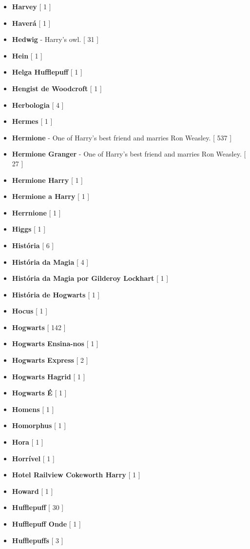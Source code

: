 \documentclass[a4paper]{article}
\begin{document}
\begin{itemize}
	\item \textbf{Harvey} [ 1 ]
	\item \textbf{Haverá} [ 1 ]
	\item \textbf{Hedwig} - Harry's owl. [ 31 ]
	\item \textbf{Hein} [ 1 ]
	\item \textbf{Helga Hufflepuff} [ 1 ]
	\item \textbf{Hengist de Woodcroft} [ 1 ]
	\item \textbf{Herbologia} [ 4 ]
	\item \textbf{Hermes} [ 1 ]
	\item \textbf{Hermione} - One of Harry's best friend and marries Ron Weasley. [ 537 ]
	\item \textbf{Hermione Granger} - One of Harry's best friend and marries Ron Weasley. [ 27 ]
	\item \textbf{Hermione Harry} [ 1 ]
	\item \textbf{Hermione a Harry} [ 1 ]
	\item \textbf{Herrnione} [ 1 ]
	\item \textbf{Higgs} [ 1 ]
	\item \textbf{História} [ 6 ]
	\item \textbf{História da Magia} [ 4 ]
	\item \textbf{História da Magia por Gilderoy Lockhart} [ 1 ]
	\item \textbf{História de Hogwarts} [ 1 ]
	\item \textbf{Hocus} [ 1 ]
	\item \textbf{Hogwarts} [ 142 ]
	\item \textbf{Hogwarts Ensina-nos} [ 1 ]
	\item \textbf{Hogwarts Express} [ 2 ]
	\item \textbf{Hogwarts Hagrid} [ 1 ]
	\item \textbf{Hogwarts É} [ 1 ]
	\item \textbf{Homens} [ 1 ]
	\item \textbf{Homorphus} [ 1 ]
	\item \textbf{Hora} [ 1 ]
	\item \textbf{Horrível} [ 1 ]
	\item \textbf{Hotel Railview Cokeworth Harry} [ 1 ]
	\item \textbf{Howard} [ 1 ]
	\item \textbf{Hufflepuff} [ 30 ]
	\item \textbf{Hufflepuff Onde} [ 1 ]
	\item \textbf{Hufflepuffs} [ 3 ]

\end{itemize}
\end{document}
